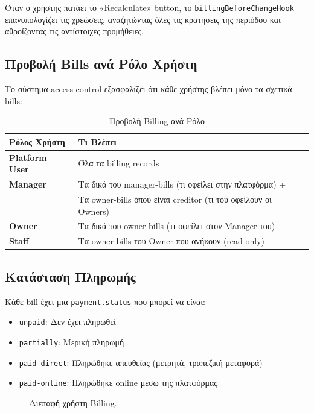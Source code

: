 \documentclass[
	12pt, %
	oneside, %
	greek,
	onehalfspacing, %
	liststotoc, %
	toctotoc, %
	parskip, %
	headsepline, %
]{MastersDoctoralThesis} %
\newcommand{\code}[1]{\texttt{#1}}
\begin{document}
Όταν ο χρήστης πατάει το «Recalculate» button, το \code{billingBeforeChangeHook} επανυπολογίζει τις χρεώσεις, αναζητώντας όλες τις κρατήσεις της περιόδου και αθροίζοντας τις αντίστοιχες προμήθειες.

\subsection{Προβολή Bills ανά Ρόλο Χρήστη}
\label{subsec:bills-view}

Το σύστημα access control εξασφαλίζει ότι κάθε χρήστης βλέπει μόνο τα σχετικά bills:

\begin{table}[H]
\centering
\caption{Προβολή Billing ανά Ρόλο}
\label{tab:billing-view}
\begin{tabular}{@{}ll@{}}
\toprule
\textbf{Ρόλος Χρήστη} & \textbf{Τι Βλέπει} \\
\midrule
\textbf{Platform User} & Όλα τα billing records \\
\textbf{Manager} & Τα δικά του manager-bills (τι οφείλει στην πλατφόρμα) + \\
& Τα owner-bills όπου είναι creditor (τι του οφείλουν οι Owners) \\
\textbf{Owner} & Τα δικά του owner-bills (τι οφείλει στον Manager του) \\
\textbf{Staff} & Τα owner-bills του Owner που ανήκουν (read-only) \\
\bottomrule
\end{tabular}
\end{table}

\subsection{Κατάσταση Πληρωμής}
\label{subsec:payment-status}

Κάθε bill έχει μια \code{payment.status} που μπορεί να είναι:

\begin{itemize}
    \item \code{unpaid}: Δεν έχει πληρωθεί
    \item \code{partially}: Μερική πληρωμή
    \item \code{paid-direct}: Πληρώθηκε απευθείας (μετρητά, τραπεζική μεταφορά)
    \item \code{paid-online}: Πληρώθηκε online μέσω της πλατφόρμας
\end{itemize}

\begin{figure}[H]
    \centering
    \caption{Διεπαφή χρήστη Billing.}
    \label{fig:billing-ui}
\end{figure}
\end{document}

